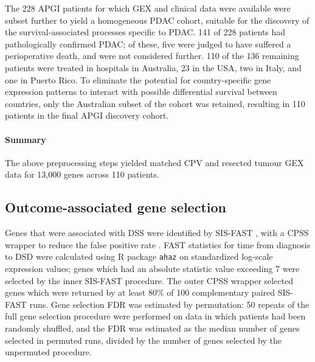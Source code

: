 \documentclass[dissertation.tex]{subfiles}
\begin{document}
The 228 \gls{APGI} patients for which \gls{GEX} and clinical data were available were subset further to yield a homogeneous \gls{PDAC} cohort, suitable for the discovery of the survival-associated processes specific to \gls{PDAC}.  141 of 228 patients had pathologically confirmed \gls{PDAC}; of these, five were judged to have suffered a perioperative death, and were not considered further.  110 of the 136 remaining patients were treated in hospitals in Australia, 23 in the USA, two in Italy, and one in Puerto Rico.  To eliminate the potential for country-specific gene expression patterns to interact with possible differential survival between countries, only the Australian subset of the cohort was retained, resulting in 110 patients in the final \gls{APGI} discovery cohort.

\paragraph{Summary}
The above preprocessing steps yielded matched \gls{CPV} and resected tumour \gls{GEX} data for 13,000 genes across 110 patients.

\subsection{Outcome-associated gene selection}
Genes that were associated with \gls{DSS} were identified by \gls{SIS}-\gls{FAST} \cite{Gorst-Rasmussen2013}, with a \gls{CPSS} wrapper to reduce the false positive rate \cite{Shah2013}.  \gls{FAST} statistics for time from diagnosis to \gls{DSD} were calculated using R package \texttt{ahaz} on standardized log-scale expression values; genes which had an absolute statistic value exceeding 7 were selected by the inner \gls{SIS}-\gls{FAST} procedure.  The outer \gls{CPSS} wrapper selected genes which were returned by at least 80\% of 100 complementary paired \gls{SIS}-\gls{FAST} runs.  Gene selection \gls{FDR} was estimated by permutation: 50 repeats of the full gene selection procedure were performed on data in which patients had been randomly shuffled, and the \gls{FDR} was estimated as the median number of genes selected in permuted runs, divided by the number of genes selected by the unpermuted procedure.
\end{document}
